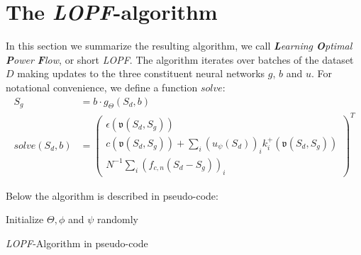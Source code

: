 \section{The \emph{LOPF}-algorithm}
\label{sec:LOPFalgo}
In this section we summarize the resulting algorithm, we call \emph{\textbf{L}earning \textbf{O}ptimal \textbf{P}ower \textbf{F}low}, or short \emph{LOPF}. The algorithm iterates over batches of the dataset $D$ making updates to the three constituent neural networks $g$, $b$ and $u$. For notational convenience, we define a function $solve$:
\begin{align*}
S_g &= b \cdot g_\Theta(S_d, b)\\
solve(S_d,b)
&=
\begin{pmatrix}
\epsilon(\mathfrak{v}(S_d,S_g)) \\
 c(\mathfrak{v}(S_d,S_g)) + \sum_i (u_\psi(S_d))_i k^+_i(\mathfrak{v}(S_d,S_g)) \\
N^{-1}\sum_i (f_{c,n}(S_d - S_g))_i
\end{pmatrix}^T
\end{align*}

 Below the algorithm is described in pseudo-code:


\begin{algorithm}[htb]
Initialize $\Theta, \phi$ and $\psi$ randomly\;
\caption{\emph{LOPF}-Algorithm in pseudo-code}
\end{algorithm}

